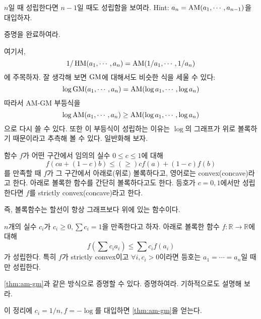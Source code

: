 \begin{exercise}
    $n$일 때 성립한다면 $n-1$일 때도 성립함을 보여라. Hint: $a_n=\operatorname{AM}(a_1, \cdots, a_{n-1})$을 대입하자. 
\end{exercise}
\begin{exercise}
    증명을 완료하여라. 
\end{exercise}
여기서, \begin{equation*}
    1/\operatorname{HM}(a_1, \cdots, a_n)=\operatorname{AM}(1/a_1, \cdots, 1/a_n)
\end{equation*}에 주목하자. 잘 생각해 보면 $\operatorname{GM}$에 대해서도 비슷한 식을 세울 수 있다: 
\begin{equation*}
    \log \operatorname{GM}(a_1, \cdots, a_n)=\operatorname{AM}(\log a_1, \cdots, \log a_n)
\end{equation*}
따라서 AM-GM 부등식을
\begin{equation*}
    \log \operatorname{AM}(a_1, \cdots, a_n)\geq \operatorname{AM}(\log a_1, \cdots, \log a_n)
\end{equation*}
으로 다시 쓸 수 있다. 또한 이 부등식이 성립하는 이유는 $\log$의 그래프가 위로 볼록하기 때문이라고 추측해 볼 수 있다. 일반화해 보자. 
\begin{definition}\label{def:convex}
    함수 $f$가 어떤 구간에서 임의의 실수 $0\leq c\leq 1$에 대해 $$f(ca+(1-c)b)\leq(\geq) cf(a)+(1-c)f(b)$$를 만족할 때 $f$가 그 구간에서 아래로(위로) 볼록하다고, 영어로는 convex(concave)라고 한다. 아래로 볼록한 함수를 간단히 볼록하다고도 한다. 등호가 $c=0, 1$에서만 성립한다면 $f$를 strictly convex(concave)라고 한다. 
\end{definition}
\begin{remark}
    즉, 볼록함수는 할선이 항상 그래프보다 위에 있는 함수이다. 
\end{remark}
\begin{theorem}[젠센 부등식]\label{thm:Jensen}
$n$개의 실수 $c_i$가 $c_i\geq 0, \sum c_i=1$을 만족한다고 하자. 아래로 볼록한 함수 $f: \mathbb{R}\to\mathbb{R}$에 대해 $$f\left(\sum c_ia_i\right)\leq \sum c_if(a_i)$$가 성립한다. 특히 $f$가 strictly convex이고 $\forall i, c_i>0$이라면 등호는 $a_1=\cdots=a_n$일 때만 성립한다. 
\end{theorem}
\begin{exercise}
\cref{thm:am-gm}과 같은 방식으로 증명할 수 있다. 증명하여라. 기하적으로도 설명해 보라. 
\end{exercise}
\begin{remark}
    이 정리에 $c_i=1/n, f=-\log$를 대입하면 \cref{thm:am-gm}을 얻는다. 
\end{remark}
